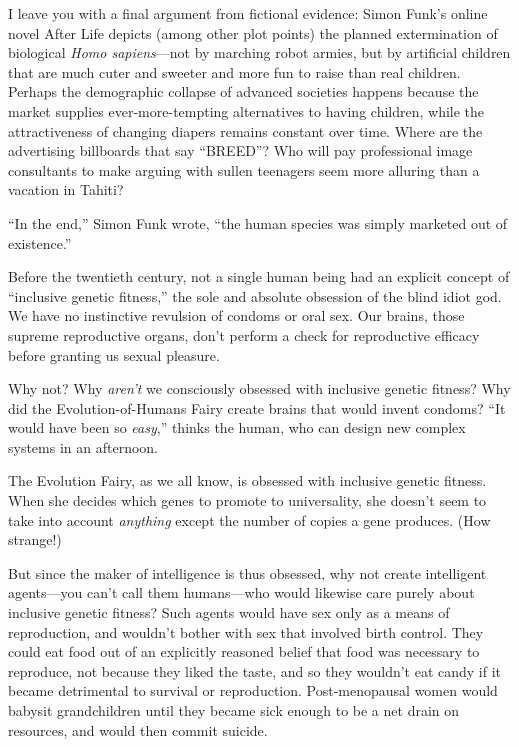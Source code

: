 {
 I leave you with a final argument from fictional evidence: Simon
Funk's online novel After Life depicts (among other
plot points) the planned extermination of biological \textit{Homo
sapiens}{}---not by marching robot armies, but by artificial children
that are much cuter and sweeter and more fun to raise than real
children. Perhaps the demographic collapse of advanced societies
happens because the market supplies ever-more-tempting alternatives to
having children, while the attractiveness of changing diapers remains
constant over time. Where are the advertising billboards that say
``BREED''? Who will pay professional
image consultants to make arguing with sullen teenagers seem more
alluring than a vacation in Tahiti?}

{
 ``In the end,'' Simon Funk
wrote, ``the human species was simply marketed out of
existence.''}

\myendsectiontext


{
 Before the twentieth century, not a single human being had an
explicit concept of ``inclusive genetic
fitness,'' the sole and absolute obsession of the
blind idiot god. We have no instinctive revulsion of condoms or oral
sex. Our brains, those supreme reproductive organs,
don't perform a check for reproductive efficacy before
granting us sexual pleasure. }

{
 Why not? Why \textit{aren't} we consciously
obsessed with inclusive genetic fitness? Why did the
Evolution-of-Humans Fairy create brains that would invent condoms?
``It would have been so
\textit{easy},'' thinks the human, who can design new
complex systems in an afternoon.}

{
 The Evolution Fairy, as we all know, is obsessed with inclusive
genetic fitness. When she decides which genes to promote to
universality, she doesn't seem to take into account
\textit{anything} except the number of copies a gene produces. (How
strange!)}

{
 But since the maker of intelligence is thus obsessed, why not
create intelligent agents---you can't call them
humans---who would likewise care purely about inclusive genetic
fitness? Such agents would have sex only as a means of reproduction,
and wouldn't bother with sex that involved birth
control. They could eat food out of an explicitly reasoned belief that
food was necessary to reproduce, not because they liked the taste, and
so they wouldn't eat candy if it became detrimental to
survival or reproduction. Post-menopausal women would babysit
grandchildren until they became sick enough to be a net drain on
resources, and would then commit suicide.}

